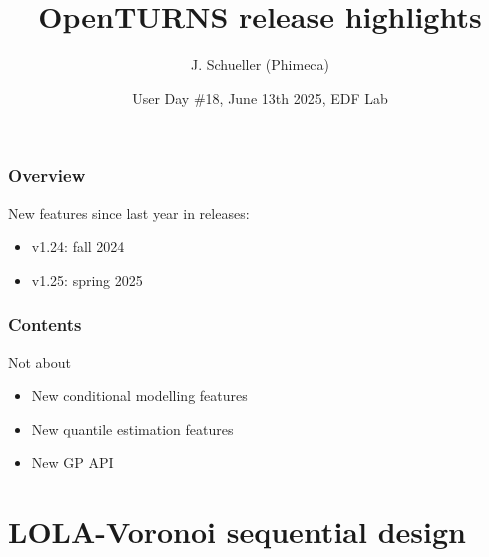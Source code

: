 \documentclass[aspectratio=169]{beamer}
\title[OpenTURNS]{OpenTURNS release highlights}
\author[OpenTURNS et al.]{J. Schueller (Phimeca)}
\date[]{User Day \#18, June 13th 2025, EDF Lab}
\begin{document}

\begin{frame}
  \titlepage

\end{frame}


\begin{frame}
\frametitle{Overview}

New features since last year in releases:

\begin{itemize}
\item v1.24: fall 2024
\item v1.25: spring 2025
\end{itemize}

\end{frame}
  

\begin{frame}
\frametitle{Contents}
\tableofcontents
\end{frame}


\begin{frame}{Not about}

\begin{itemize}
\item New conditional modelling features
\item New quantile estimation features
\item New GP API
\end{itemize}

\end{frame}


\section{LOLA-Voronoi sequential design}
\end{document}
